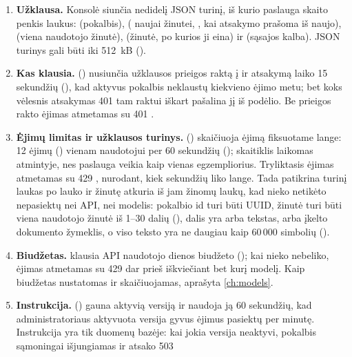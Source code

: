 \begin{enumerate}
  \item \textbf{Užklausa.} Konsolė siunčia nedidelį JSON turinį, iš kurio paslauga skaito penkis
    laukus:  (pokalbis),  ( naujai žinutei,
    , kai atsakymo prašoma iš naujo),  (viena naudotojo
    žinutė),  (žinutė, po kurios ji eina) ir  (sąsajos kalba). JSON
    turinys gali būti iki 512~kB ().
  \item \textbf{Kas klausia.}  () nusiunčia
    užklausos prieigos raktą į  ir atsakymą laiko 15 sekundžių
    (), kad aktyvus pokalbis neklaustų kiekvieno ėjimo metu; bet koks
    vėlesnis atsakymas 401 tam raktui iškart pašalina jį iš podėlio. Be prieigos rakto ėjimas
    atmetamas su 401 .
  \item \textbf{Ėjimų limitas ir užklausos turinys.} 
    () skaičiuoja ėjimą fiksuotame lange: 12 ėjimų
    () vienam naudotojui per 60 sekundžių ();
    skaitiklis laikomas atmintyje, nes paslauga veikia kaip vienas egzempliorius. Tryliktasis ėjimas
    atmetamas su 429 , nurodant, kiek sekundžių liko lange. Tada
     patikrina turinį laukas po lauko ir žinutę atkuria iš jam žinomų laukų,
    kad nieko netikėto nepasiektų nei API, nei modelis: pokalbio id turi būti UUID, žinutė turi
    būti viena naudotojo žinutė iš 1--30 dalių (), dalis yra arba tekstas, arba
    įkelto dokumento žymeklis, o viso teksto yra ne daugiau kaip 60\,000 simbolių
    ().
  \item \textbf{Biudžetas.}  klausia API naudotojo dienos biudžeto
    (); kai nieko nebeliko, ėjimas atmetamas su 429
     dar prieš iškviečiant bet kurį modelį. Kaip biudžetas nustatomas ir
    skaičiuojamas, aprašyta \cref{ch:models}.
  \item \textbf{Instrukcija.}  () gauna aktyvią
     versiją ir naudoja ją 60 sekundžių, kad administratoriaus
    aktyvuota versija gyvus ėjimus pasiektų per minutę. Instrukcija yra tik duomenų
    bazėje: kai jokia versija neaktyvi, pokalbis sąmoningai išjungiamas ir atsako 503

\end{enumerate}
